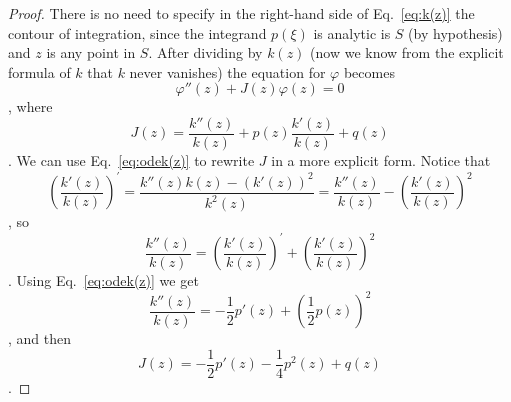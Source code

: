 \begin{proof}
   There is no need to specify in the right-hand side of Eq.~\eqref{eq:k(z)} the
   contour of integration, since the integrand
   $p(\xi)$ is analytic is $S$ (by hypothesis) and $z$ is any point in $S$.
   After dividing by $k(z)$ (now we know from the explicit formula of $k$ that
   $k$ never vanishes) the equation for $\varphi$ becomes  
   \begin{dmath}[label={odev(z)}]
      \varphi''(z) + J(z) \varphi(z) = 0
   \end{dmath},
   where 
   \begin{dmath*}
      J(z) = \frac{k''(z)}{k(z)} + p(z) \frac{k'(z)}{k(z)} + q(z)
   \end{dmath*}.
   We can use Eq.~\eqref{eq:odek(z)} to rewrite $J$ in a more explicit form.
   Notice that
   \begin{dmath*}[compact]
      \left( \frac{k'(z)}{k(z)} \right)^{\prime} = 
      \frac{k''(z) k(z) - \left( k'(z) \right) ^{2} }{k^{2}(z)} = \frac{k''(z)}{k(z)}
      - \left( \frac{k'(z)}{k(z)} \right)^{2} 
   \end{dmath*},
   so
   \begin{dmath*}
      \frac{k''(z)}{k(z)} = \left( \frac{k'(z)}{k(z)} \right)^{\prime} + \left(
	 \frac{k'(z)}{k(z)} \right)^{2} 
   \end{dmath*}.
   Using Eq.~\eqref{eq:odek(z)} we get
   \begin{dmath*}
      \frac{k''(z)}{k(z)} = - \frac{1}{2} p'(z)  + \left( \frac{1}{2} p(z)
      \right)^{2}
   \end{dmath*},
   and then
   \begin{dmath}[label={J(z)}]
      J(z) =  - \frac{1}{2} p'(z) - \frac{1}{4} p^{2} (z) + q(z) 
   \end{dmath}.


\end{proof}
